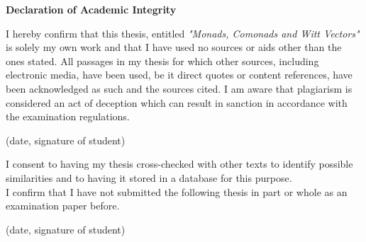 \begin{center}
\large{\textbf{Declaration of Academic Integrity}}
\end{center}

\vspace{1cm}

\normalsize I hereby confirm that this thesis, entitled \textit{"Monads, Comonads and Witt Vectors"} is solely my own work and that I have used no sources or aids other than the ones stated. All passages in my thesis for which other sources, including electronic media, have been used, be it direct quotes or content references, have been acknowledged as such and the sources cited. I am aware that plagiarism is considered an act of deception which can result in sanction in accordance with the examination regulations.

\vspace{1cm}


(date, signature of student)

\vspace{1cm}

I consent to having my thesis cross-checked with other texts to identify possible similarities and to having it stored in a database for this purpose.\\

I confirm that I have not submitted the following thesis in part or whole as an examination paper before.

\vspace{1cm}


(date, signature of student)
\thispagestyle{empty}

